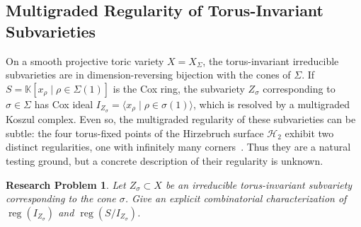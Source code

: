 \documentclass[11pt,reqno]{amsart}
\newtheorem{problem}[lemma]{Research Problem}
\theoremstyle{remark}
\newcommand{\reg}{\operatorname{reg}}
\newcommand{\Bl}{\operatorname{Bl}}
\newcommand{\dd}{\mathbf{d}}
\newcommand{\KK}{\mathbb{K}}
\newcommand{\PP}{\mathbb{P}}
\newcommand{\cD}{\mathcal{D}}
\newcommand{\cH}{\mathcal{H}}
\newcommand{\cO}{\mathcal{O}}
\newcommand{\cR}{\mathcal{R}}
\begin{document}

 \subsection{Multigraded Regularity of Torus-Invariant Subvarieties}

On a smooth projective toric variety $X = X_\Sigma$, the torus-invariant irreducible subvarieties are in dimension-reversing bijection with the cones of $\Sigma$. If $S=\KK[x_\rho \mid \rho\in \Sigma(1)]$ is the Cox ring, the subvariety $Z_\sigma$ corresponding to $\sigma\in\Sigma$ has Cox ideal $I_{Z_\sigma} = \langle x_\rho \mid \rho \in \sigma(1) \rangle$, which is resolved by a multigraded Koszul complex. Even so, the multigraded regularity of these subvarieties can be subtle: the four torus-fixed points of the Hirzebruch surface $\cH_2$ exhibit two distinct regularities, one with infinitely many corners~\cite{bruceHellerSayrafi22}. Thus they are a natural testing ground, but a concrete description of their regularity is unknown.
\begin{problem}\label{prob:torus-invariant-mg}
	Let $Z_{\sigma} \subset X$ be an irreducible torus-invariant subvariety corresponding to the cone $\sigma$. Give an explicit combinatorial characterization of $\reg(I_{Z_\sigma})$ and $\reg(S/I_{Z_\sigma})$.
\end{problem}
\end{document}
